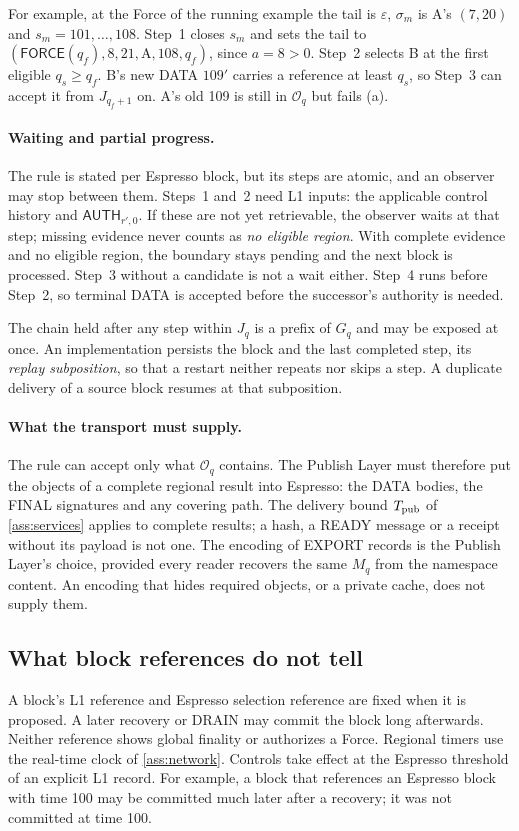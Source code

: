 \documentclass[11pt,a4paper]{article}
\newcommand{\tagg}[1]{\ensuremath{\mathsf{#1}}}
\newcommand{\defterm}[1]{\textcolor{rrBlue}{\textit{#1}}}
\begin{document}
For example, at the Force of the running example the tail is
$\varepsilon$, $\sigma_m$ is A's $(7,20)$ and $s_m=101,\ldots,108$. Step~1
closes $s_m$ and sets the tail to
$(\tagg{FORCE}(q_f),8,21,\text{A},108,q_f)$, since $a=8>0$. Step~2
selects B at the first eligible $q_s\ge q_f$. B's new DATA $109'$ carries
a reference at least $q_s$, so Step~3 can accept it from
$J_{q_f+1}$ on. A's old 109 is still in $\mathcal O_q$ but fails (a).

\paragraph{Waiting and partial progress.}
\label{sec:subpositions}
\label{sec:terminal-commit}
The rule is stated per Espresso block, but its steps are atomic, and an
observer may stop between them. Steps~1 and~2 need L1 inputs: the
applicable control history and $\tagg{AUTH}_{r',0}$. If these are not yet
retrievable, the observer waits at that step; missing evidence never
counts as \emph{no eligible region}. With complete evidence and no
eligible region, the boundary stays pending and the next block is
processed. Step~3 without a candidate is not a wait either. Step~4 runs
before Step~2, so terminal DATA is accepted before the successor's
authority is needed.

The chain held after any step within $J_q$ is a prefix of $G_q$ and may
be exposed at once. An implementation persists the block and the last
completed step, its \defterm{replay subposition}, so that a restart
neither repeats nor skips a step. A duplicate delivery of a source block
resumes at that subposition.

\paragraph{What the transport must supply.}
\label{sec:transport-scope}
The rule can accept only what $\mathcal O_q$ contains. The Publish Layer
must therefore put the objects of a complete regional result into
Espresso: the DATA bodies, the FINAL signatures and any covering path.
The delivery bound $T_{\rm pub}$ of \cref{ass:services} applies to
complete results; a hash, a READY message or a receipt without its
payload is not one. The encoding of EXPORT records is the Publish Layer's
choice, provided every reader recovers the same $M_q$ from the namespace
content. An encoding that hides required objects, or a private cache,
does not supply them.

\subsection{What block references do not tell}
\label{sec:late-receipt}
A block's L1 reference and Espresso selection reference are fixed when it
is proposed. A later recovery or DRAIN may commit the block long
afterwards. Neither reference shows global finality or authorizes a
Force. Regional timers use the real-time clock of \cref{ass:network}.
Controls take effect at the Espresso threshold of an explicit L1 record.
For example, a block that references an Espresso block with time 100 may
be committed much later after a recovery; it was not committed at time
100.
\end{document}
